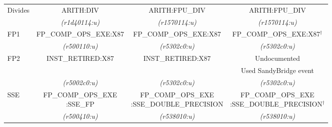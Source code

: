 \begin{tabular}{|l||c|c|c|}
\hline
\multirow{2}{*}{\parbox{0.5in}{Divides}} &
ARITH:DIV		& %
ARITH:FPU\_DIV		& %
ARITH:FPU\_DIV		\\ %

                      &
{\em (r1d40114:u)}    & %
{\em (r1570114:u)}    & %
{\em (r1570114:u)}    \\ %


\hline
\multirow{2}{*}{\parbox{0.5in}{FP1}}  &
FP\_COMP\_OPS\_EXE:X87 & %
FP\_COMP\_OPS\_EXE:X87 & %
FP\_COMP\_OPS\_EXE:X87$^{\dagger}$              \\ %

                      &
{\em (r500110:u)}     & %
{\em (r5302c0:u)}     & %
{\em (r5302c0:u)}     \\ %


\hline
\multirow{3}{*}{\parbox{0.5in}{FP2}}     &  
INST\_RETIRED:X87        & %
INST\_RETIRED:X87        & %
Undocumented                              \\ %

               &  
		&
		&
Used SandyBridge event \\ %



                      &
{\em (r5002c0:u)}     & %
{\em (r5302c0:u)}     & %
{\em (r5302c0:u)}     \\ %


\hline
\multirow{3}{*}{\parbox{0.5in}{SSE}}   & 
\multirow{2}{*}{\parbox{1.2in}{\centering FP\_COMP\_OPS\_EXE\\:SSE\_FP}} & %
\multirow{2}{*}{\parbox{1.4in}{\centering FP\_COMP\_OPS\_EXE\\:SSE\_DOUBLE\_PRECISION}} & %
\multirow{2}{*}{\parbox{1.4in}{\centering FP\_COMP\_OPS\_EXE\\:SSE\_DOUBLE\_PRECISION$^{\dagger}$}} \\ %



               &  
		& %
		& %
		\\  %

                      &
{\em (r500410:u)}     & %
{\em (r538010:u)}     & %
{\em (r538010:u)}     \\ %




\end{tabular}
